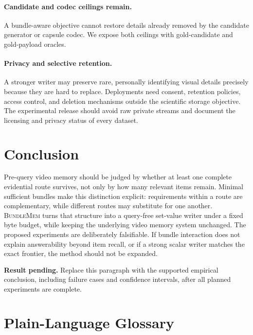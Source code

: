 \documentclass[10pt,twocolumn,letterpaper]{article}
\newcommand{\method}{\textnormal{\textsc{BundleMem}}\xspace}
\newcommand{\resultpending}[1]{%
  \begingroup\setlength{\fboxsep}{3pt}%
  \colorbox{placeholdergray}{\parbox{0.94\linewidth}{\textcolor{draftorange}{\textbf{Result pending.} #1}}}%
  \endgroup}
\begin{document}
\paragraph{Candidate and codec ceilings remain.}
A bundle-aware objective cannot restore details already removed by the candidate generator or capsule codec.
We expose both ceilings with gold-candidate and gold-payload oracles.

\paragraph{Privacy and selective retention.}
A stronger writer may preserve rare, personally identifying visual details precisely because they are hard to replace.
Deployments need consent, retention policies, access control, and deletion mechanisms outside the scientific storage objective.
The experimental release should avoid raw private streams and document the licensing and privacy status of every dataset.

\section{Conclusion}
\label{sec:conclusion}

Pre-query video memory should be judged by whether at least one complete evidential route survives, not only by how many relevant items remain.
Minimal sufficient bundles make this distinction explicit: requirements within a route are complementary, while different routes may substitute for one another.
\method turns that structure into a query-free set-value writer under a fixed byte budget, while keeping the underlying video memory system unchanged.
The proposed experiments are deliberately falsifiable.
If bundle interaction does not explain answerability beyond item recall, or if a strong scalar writer matches the exact frontier, the method should not be expanded.
\resultpending{Replace this paragraph with the supported empirical conclusion, including failure cases and confidence intervals, after all planned experiments are complete.}

{\small


}

\appendix

\section{Plain-Language Glossary}
\label{app:glossary}
\end{document}
